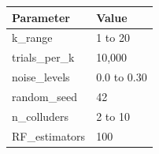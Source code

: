 \begin{tabular}{ll}
\toprule
Parameter & Value \\
\midrule
k_range & 1 to 20 \\
trials_per_k & 10,000 \\
noise_levels & 0.0 to 0.30 \\
random_seed & 42 \\
n_colluders & 2 to 10 \\
RF_estimators & 100 \\
\bottomrule
\end{tabular}
